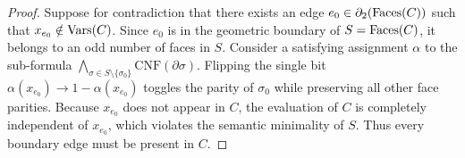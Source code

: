 \begin{proof}
Suppose for contradiction that there exists an edge $e_0 \in \partial_2(\mathrm{Faces}(C))$ such that $x_{e_0} \notin \mathrm{Vars}(C)$.
Since $e_0$ is in the geometric boundary of $S = \mathrm{Faces}(C)$, it belongs to an odd number of faces in $S$.
Consider a satisfying assignment $\alpha$ to the sub-formula $\bigwedge_{\sigma \in S \setminus \{\sigma_0\}} \mathrm{CNF}(\partial \sigma)$. 
Flipping the single bit $\alpha(x_{e_0}) \to 1 - \alpha(x_{e_0})$ toggles the parity of $\sigma_0$ while preserving all other face parities. 
Because $x_{e_0}$ does not appear in $C$, the evaluation of $C$ is completely independent of $x_{e_0}$, which violates the semantic minimality of $S$.
Thus every boundary edge must be present in $C$.
\end{proof}
